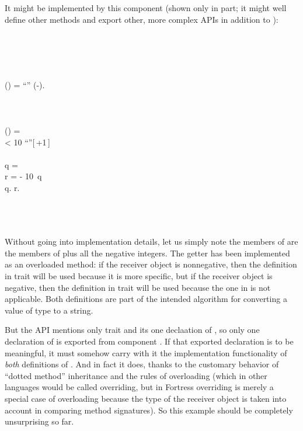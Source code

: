 It might be implemented by this component (shown only in part; it might well define
other methods and export other, more complex APIs in addition to ):
\begin{codeexamplesize}
\begin{FortressCode}
  \\
  \\
 \\
  \\
\2\+ (\ultrathin) = \hbox{\rm{}``\STR{{-}}''} \mathrel{\Vert} (-\;).\- \\
 \\
 \\
    \\
\2\+ (\ultrathin) = \\
  \2\+\;\;  < 10  \hbox{\rm{}``''}[\,\COLONOP{}+1\,] \\
     \\
    \2\+q =\;   \\
      r =\;  - 10\, q \\
      q. \mathrel{\Vert} r.\- \\
    \-\- \\
 \\
 \\
 
\end{FortressCode}
\end{codeexamplesize}
Without going into implementation details, let us simply note
the members of  are the members of  plus all the
negative integers.  The getter  has been implemented
as an overloaded method: if the receiver object is
nonnegative, then the definition in trait  will be used
because it is more specific, but if the receiver object
is negative, then the definition in trait  will be used
because the one in  is not applicable.  Both definitions
are part of the intended algorithm for converting
a value of type  to a string.

But the API mentions only trait  and its one declaation of , so only
one declaration of  is exported from component .
If that exported declaration is to be meaningful,
it must somehow carry with it the implementation functionality
of \emph{both} definitions of .
And in fact it does, thanks to the customary behavior of
``dotted method'' inheritance and the rules of overloading
(which in other languages would be called overriding,
but in Fortress overriding is merely a special case of
overloading because the type of the receiver object is
taken into account in comparing method signatures).
So this example should be completely unsurprising so far.


